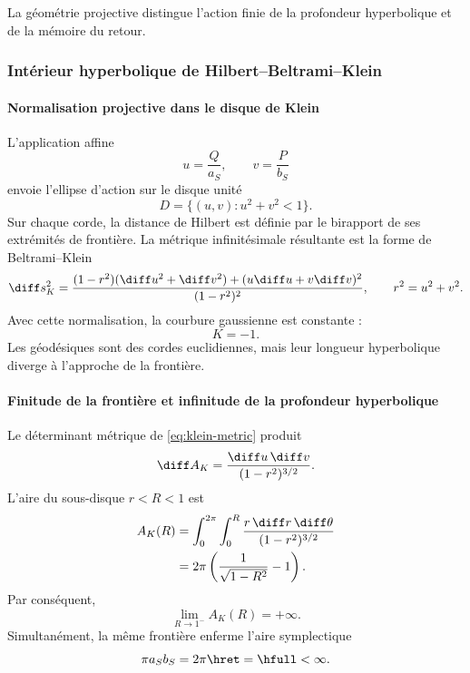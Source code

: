 \noindent La géométrie projective distingue l'action finie de la profondeur hyperbolique et de la mémoire du retour.\par\medskip

\subsubsection{Intérieur hyperbolique de Hilbert--Beltrami--Klein}

\paragraph{Normalisation projective dans le disque de Klein}

L'application affine
\[
u=\frac{Q}{a_S},\qquad v=\frac{P}{b_S}
\]
envoie l'ellipse d'action sur le disque unité
\[
D=\{(u,v):u^2+v^2<1\}.
\]
Sur chaque corde, la distance de Hilbert est définie par le birapport
de ses extrémités de frontière. La métrique infinitésimale résultante est la forme
de Beltrami--Klein
\begin{equation}
\diff s_K^2=
\frac{(1-r^2)(\diff u^2+\diff v^2)+(u\diff u+v\diff v)^2}
{(1-r^2)^2},
\qquad r^2=u^2+v^2.
\label{eq:klein-metric}
\end{equation}
Avec cette normalisation, la courbure gaussienne est constante :
\begin{equation}
K=-1.
\label{eq:klein-curvature}
\end{equation}
Les géodésiques sont des cordes euclidiennes, mais leur longueur hyperbolique diverge
à l'approche de la frontière.

\paragraph{Finitude de la frontière et infinitude de la profondeur hyperbolique}

Le déterminant métrique de \eqref{eq:klein-metric} produit
\begin{equation}
\diff A_K=\frac{\diff u\,\diff v}{(1-r^2)^{3/2}}.
\label{eq:klein-area-density}
\end{equation}
L'aire du sous-disque \(r<R<1\) est
\begin{align}
A_K(R)
&=\int_0^{2\pi}\int_0^R
\frac{r\,\diff r\,\diff\theta}{(1-r^2)^{3/2}}\\
&=2\pi\left(\frac1{\sqrt{1-R^2}}-1\right).
\label{eq:klein-area-R}
\end{align}
Par conséquent,
\[
\lim_{R\to1^-}A_K(R)=+\infty.
\]
Simultanément, la même frontière enferme l'aire symplectique
\[
\pi a_Sb_S=2\pi\hret=\hfull<\infty.
\]

